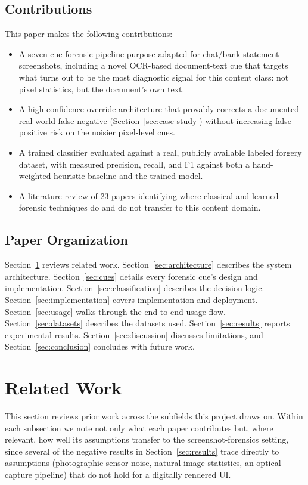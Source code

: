 \documentclass[conference]{IEEEtran}
\begin{document}
\subsection{Contributions}
This paper makes the following contributions:
\begin{itemize}
\item A seven-cue forensic pipeline purpose-adapted for chat/bank-statement
screenshots, including a novel OCR-based document-text cue that targets what
turns out to be the most diagnostic signal for this content class: not pixel
statistics, but the document's own text.
\item A high-confidence override architecture that provably corrects a
documented real-world false negative (Section~\ref{sec:case-study}) without
increasing false-positive risk on the noisier pixel-level cues.
\item A trained classifier evaluated against a real, publicly available
labeled forgery dataset, with measured precision, recall, and F1 against both
a hand-weighted heuristic baseline and the trained model.
\item A literature review of 23 papers identifying where classical and
learned forensic techniques do and do not transfer to this content domain.
\end{itemize}

\subsection{Paper Organization}
Section~\ref{sec:related} reviews related work. Section~\ref{sec:architecture}
describes the system architecture. Section~\ref{sec:cues} details every
forensic cue's design and implementation.
Section~\ref{sec:classification} describes the decision logic.
Section~\ref{sec:implementation} covers implementation and deployment.
Section~\ref{sec:usage} walks through the end-to-end usage flow.
Section~\ref{sec:datasets} describes the datasets used.
Section~\ref{sec:results} reports experimental results.
Section~\ref{sec:discussion} discusses limitations, and
Section~\ref{sec:conclusion} concludes with future work.

\section{Related Work}
\label{sec:related}

This section reviews prior work across the subfields this project draws on.
Within each subsection we note not only what each paper contributes but,
where relevant, how well its assumptions transfer to the screenshot-forensics
setting, since several of the negative results in Section~\ref{sec:results}
trace directly to assumptions (photographic sensor noise, natural-image
statistics, an optical capture pipeline) that do not hold for a digitally
rendered UI.
\end{document}
